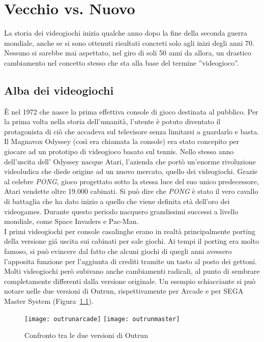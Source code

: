 \chapter{Vecchio vs. Nuovo}
La storia dei videogiochi inizia qualche anno dopo la fine della seconda guerra mondiale, anche se si sono ottenuti risultati concreti solo agli inizi degli anni 70. Nessuno si sarebbe mai aspettato,  nel giro di soli 50 anni da allora, un drastico cambiamento nel concetto stesso che sta alla base del termine ''videogioco''.
\section{Alba dei videogiochi}
È nel 1972 che nasce la prima effettiva console di gioco destinata al pubblico. Per la prima volta nella storia dell’umanità, l’utente è potuto diventato il protagonista di ciò che accadeva sul televisore senza limitarsi a guardarlo e basta. Il Magnavox Odyssey (così era chiamata la console) era stato concepito per giocare ad un prototipo di videogioco basato sul tennis. Nello stesso anno dell’uscita dell’ Odyssey nacque Atari, l’azienda che portò un’enorme rivoluzione videoludica che diede origine ad un nuovo mercato, quello dei videogiochi. Grazie al celebre \textit{PONG}, gioco progettato sotto la stessa luce del suo unico predecessore, Atari vendette oltre 19.000 cabinati. Si può dire che \textit{PONG} è stato il vero cavallo di battaglia che ha dato inizio a quello che viene definita età dell’oro dei videogames. Durante questo periodo nacquero grandissimi successi a livello mondiale, come Space Invaders e Pac-Man.\\I primi videogiochi per console casalinghe erano in realtà principalmente porting della versione giá uscita sui cabinati per sale giochi. Ai tempi il porting era molto famoso, si può evincere dal fatto che alcuni giochi di quegli anni avessero l’apposita funzione per l’aggiunta di crediti tramite un tasto al posto dei gettoni. Molti videogiochi però subivano anche cambiamenti radicali, al punto di sembrare completamente differenti dalla versione originale. Un esempio schiacciante si può notare nelle due versioni di Outrun, rispettivamente per Arcade e per SEGA Master System (Figura~\ref{fig:outrun}).\\
\begin{figure}[h!]
\texttt{[image: outrunarcade]}
\texttt{[image: outrunmaster]}
\caption{Confronto tra le due versioni di Outrun}
\label{fig:outrun}
\end{figure}
